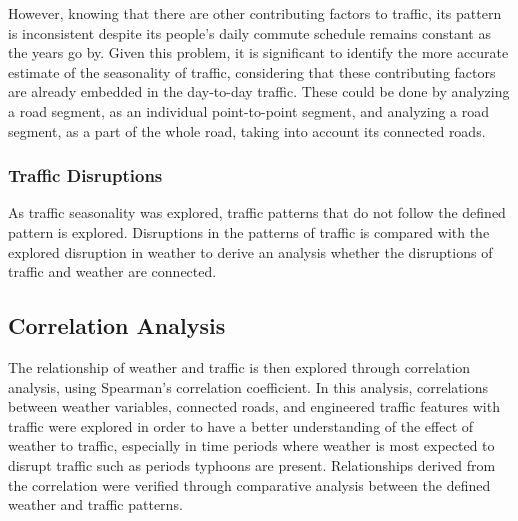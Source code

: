 However, knowing that there are other contributing factors to traffic, its pattern is inconsistent despite its people’s daily commute schedule remains constant as the years go by. Given this problem, it is significant to identify the more accurate estimate of the seasonality of traffic, considering that these contributing factors are already embedded in the day-to-day traffic. These could be done by analyzing a road segment, as an individual point-to-point segment, and analyzing a road segment, as a part of the whole road, taking into account its connected roads.

\subsubsection{Traffic Disruptions}
As traffic seasonality was explored, traffic patterns that do not follow the defined pattern is explored. Disruptions in the patterns of traffic is compared with the explored disruption in weather to derive an analysis whether the disruptions of traffic and weather are connected.

\subsection{Correlation Analysis}
The relationship of weather and traffic is then explored through correlation analysis, using Spearman’s  correlation coefficient. In this analysis, correlations between weather variables, connected roads, and engineered traffic features with traffic were explored in order to have a better understanding of the effect of weather to traffic, especially in time periods where weather is most expected to disrupt traffic such as periods typhoons are present. Relationships derived from the correlation were verified through comparative analysis between the defined weather and traffic patterns.

